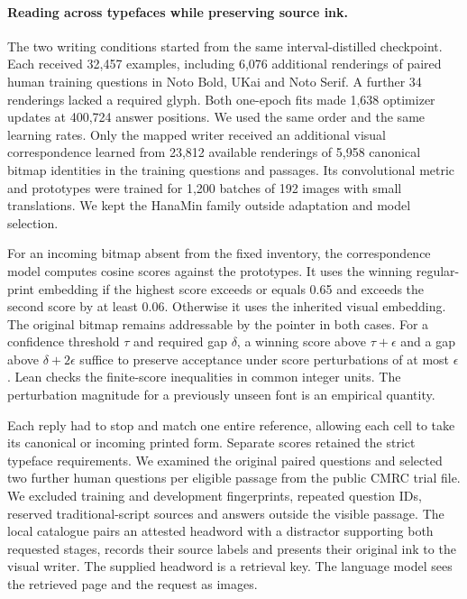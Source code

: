 \paragraph{Reading across typefaces while preserving source ink.}
The two writing conditions started from the same interval-distilled checkpoint. Each received 32,457 examples, including 6,076 additional renderings of paired human training questions in Noto Bold, UKai and Noto Serif. A further 34 renderings lacked a required glyph. Both one-epoch fits made 1,638 optimizer updates at 400,724 answer positions. We used the same order and the same learning rates. Only the mapped writer received an additional visual correspondence learned from 23,812 available renderings of 5,958 canonical bitmap identities in the training questions and passages. Its convolutional metric and prototypes were trained for 1,200 batches of 192 images with small translations. We kept the HanaMin family outside adaptation and model selection.

For an incoming bitmap absent from the fixed inventory, the correspondence model computes cosine scores against the prototypes. It uses the winning regular-print embedding if the highest score exceeds or equals 0.65 and exceeds the second score by at least 0.06. Otherwise it uses the inherited visual embedding. The original bitmap remains addressable by the pointer in both cases. For a confidence threshold $\tau$ and required gap $\delta$, a winning score above $\tau+\epsilon$ and a gap above $\delta+2\epsilon$ suffice to preserve acceptance under score perturbations of at most $\epsilon$. Lean checks the finite-score inequalities in common integer units. The perturbation magnitude for a previously unseen font is an empirical quantity.

Each reply had to stop and match one entire reference, allowing each cell to take its canonical or incoming printed form. Separate scores retained the strict typeface requirements. We examined the original paired questions and selected two further human questions per eligible passage from the public CMRC trial file. We excluded training and development fingerprints, repeated question IDs, reserved traditional-script sources and answers outside the visible passage. The local catalogue pairs an attested headword with a distractor supporting both requested stages, records their source labels and presents their original ink to the visual writer. The supplied headword is a retrieval key. The language model sees the retrieved page and the request as images.
